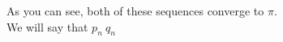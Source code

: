 \documentclass[preview]{standalone}
\begin{document}
\begin{center}
As you can see, both of these sequences converge to $\pi$.\\We will say that $p_n$$~$$q_n$
\end{center}
\end{document}
